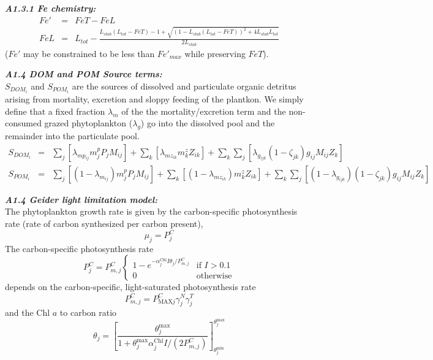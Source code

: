 \documentclass[11pt,letterpaper,english]{article}
\begin{document}
{\it {\bf A1.3.1 Fe chemistry:}}\\
\begin{eqnarray}
Fe' & = & FeT - FeL \nonumber \\
FeL & = & L_{tot} -
  \frac{ L_{stab} (L_{tot} - FeT) - 1
        +\sqrt{(1 - L_{stab} (L_{tot} - FeT))^2 + 4 L_{stab} L_{tot}}}
     {2 L_{stab}} \nonumber
\end{eqnarray}
($Fe'$ may be constrained to be less than $Fe'_{max}$ while preserving $FeT$).

 
{\it {\bf A1.4 DOM and POM Source terms:}}\\
$S_{DOM_i}$ and $S_{POM_i}$ are the sources of dissolved and particulate
organic detritus arising from mortality, excretion and sloppy feeding of the
plantkon. We simply define that a fixed fraction $\lambda_m$ of the the
mortality/excretion term and the non-consumed grazed phytoplankton
($\lambda_g$) go into the dissolved pool and the remainder into the particulate
pool. 
\begin{eqnarray}
S_{DOM_i} & = & \sum_{j} [\lambda_{mp_{ij}} m^p_j P_j M_{ij}] 
             + \sum_{k} [\lambda_{mz_{ik}} m^z_k Z_{ik}]
             + \sum_{k} \sum_{j} [\lambda_{g_{ijk}} (1-\zeta_{jk})
                                        g_{ij} M_{ij} Z_k ]
\nonumber \\
S_{POM_i} & = & \sum_{j} [(1-\lambda_{m_{ij}}) m^p_j P_j M_{ij}]
             + \sum_{k} [(1-\lambda_{mz_{ik}}) m^z_k Z_{ik}]
             + \sum_{k} \sum_{j} [(1-\lambda_{g_{ijk}}) (1-\zeta_{jk})  
                                       g_{ij} M_{ij} Z_k ]
\nonumber
\end{eqnarray}


\newcommand{\pcm}[1]{P^C_{m#1}}
\newcommand{\pcmax}[1]{P^C_{\textrm{MAX}#1}}
\newcommand{\pcarbon}{P^C}
\newcommand{\chltoc}{\theta}
\newcommand{\chltocmax}{\theta^{\textrm{max}}}
\newcommand{\chltocmin}{\theta^{\textrm{min}}}
\newcommand{\alphachl}{\alpha^{\textrm{Chl}}}
\newcommand{\mQyield}{\mathit{mQ}^{\textrm{yield}}}
\newcommand{\RPC}{R^{PC}}
\newcommand{\phychl}{\mathit{Chl}}
\newcommand{\aphychlave}{A^{\mathrm{phy}}_{\mathrm{Chl,ave}}}

{\it {\bf A1.4 Geider light limitation model:}}\\
The phytoplankton growth rate is given by the carbon-specific photosynthesis rate
(rate of carbon synthesized per carbon present),
\[
  \mu_j = \pcarbon_j
\]
The carbon-specific photosynthesis rate
\[
  \pcarbon_j = \pcm{,j} \begin{cases}
     1 - e^{-\alphachl_j I \chltoc_j/\pcm{,j}} & \text{if }I>0.1 \\
     0                                         & \text{otherwise}
   \end{cases}
\]
depends on the carbon-specific, light-saturated photosynthesis rate
\[
  \pcm{,j}=\pcmax{j} \gamma^N_j \gamma^T_j
\]
and the Chl $a$ to carbon ratio
\[
  \chltoc_j = \left[ \frac{\chltocmax_j}
                   {1 + \chltocmax_j \alphachl_j I / (2 \pcm{,j})}
		   \right]^{\chltocmax_j}_{\chltocmin_j}
\]
\end{document}
